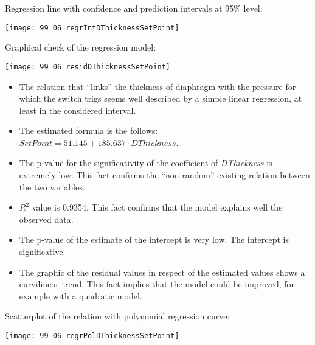 \begin{frame}
  Regression line with confidence and prediction intervals at 95\% level:\\  
  \vspace{.3cm}
  \begin{center}
    \texttt{[image: 99\_06\_regrIntDThicknessSetPoint]}
  \end{center}
\end{frame}

\begin{frame}
  Graphical check of the regression model:\\
  \vspace{.1cm}
  \begin{center}
    \texttt{[image: 99\_06\_residDThicknessSetPoint]}
    \end{center}
\end{frame}

\begin{frame}
  \begin{small}
    \begin{itemize}
      \item The relation that ``links'' the thickness of diaphragm with the pressure for which the switch trigs seems well described by a simple linear regression,  at least in the considered interval.
      \item The estimated formula is the follows: $ SetPoint = 51.145 + 185.637 \cdot DThickness $.
      \item The p-value for the significativity of the coefficient of \textit{DThickness} is extremely low. This fact confirms the  ``non random'' existing relation between the two variables.
      \item $ R^2 $ value is 0.9354. This fact confirms that the model explains well the observed data.
      \item The p-value of the estimate of the intercept is very low. The intercept is significative.
      \item The graphic of the residual values in respect of the estimated values shows a curvilinear trend. This fact implies that the model could be improved, for example with a quadratic model.
    \end{itemize}
  \end{small}
\end{frame}

\begin{frame}
  Scatterplot of the relation with polynomial regression curve:\\
  \vspace{.3cm}
  \begin{center}
    \texttt{[image: 99\_06\_regrPolDThicknessSetPoint]}
  \end{center}
\end{frame}

